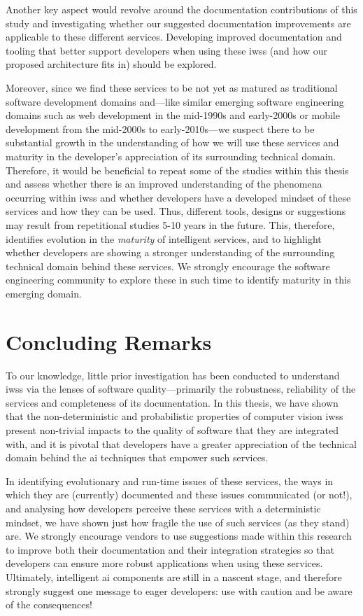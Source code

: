 Another key aspect would revolve around the documentation contributions of this study and investigating whether our suggested documentation improvements are applicable to these different services. Developing improved documentation and tooling that better support developers when using these \glspl{iws} (and how our proposed architecture fits in) should be explored. 

Moreover, since we find these services to be not yet as matured as traditional software development domains and---like similar emerging software engineering domains such as web development in the mid-1990s and early-2000s or mobile development from the mid-2000s to early-2010s---we suspect there to be substantial growth in the understanding of how we will use these services and maturity in the developer's appreciation of its surrounding technical domain. Therefore, it would be beneficial to repeat some of the studies within this thesis and assess whether there is an improved understanding of the phenomena occurring within \glspl{iws} and whether developers have a developed mindset of these services and how they can be used. Thus, different tools, designs or suggestions may result from repetitional studies 5-10 years in the future. This, therefore, identifies evolution in the \textit{maturity} of intelligent services, and to highlight whether developers are showing a stronger understanding of the surrounding technical domain behind these services. We strongly encourage the software engineering community to explore these in such time to identify maturity in this emerging domain.

\section{Concluding Remarks}

To our knowledge, little prior investigation has been conducted to understand \glspl{iws} via the lenses of software quality---primarily the robustness, reliability of the services and completeness of its documentation. In this thesis, we have shown that the non-deterministic and probabilistic properties of computer vision \glspl{iws} present non-trivial impacts to the quality of software that they are integrated with, and it is pivotal that developers have a greater appreciation of the technical domain behind the \gls{ai} techniques that empower such services. 

In identifying evolutionary and run-time issues of these services, the ways in which they are (currently) documented and these issues communicated (or not!), and analysing how developers perceive these services with a deterministic mindset, we have shown just how fragile the use of such services (as they stand) are. We strongly encourage vendors to use suggestions made within this research to improve both their documentation and their integration strategies so that developers can ensure more robust applications when using these services. Ultimately, intelligent \gls{ai} components are still in a nascent stage, and therefore strongly suggest one message to eager developers: use with caution and be aware of the consequences!


